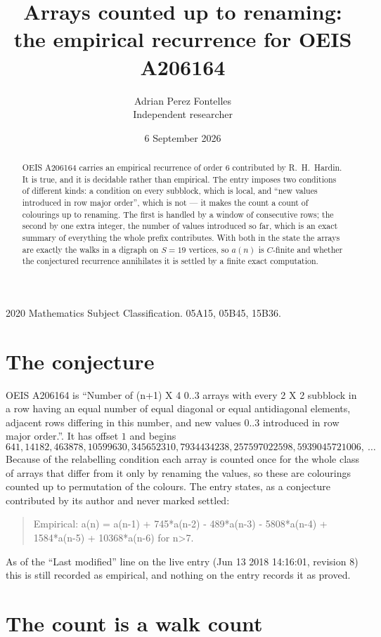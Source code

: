 \documentclass[11pt,a4paper]{article}
\title{Arrays counted up to renaming: the empirical recurrence for OEIS A206164}
\author{Adrian Perez Fontelles\\ \small Independent researcher}
\date{6 September 2026}
\theoremstyle{plain}
\theoremstyle{definition}
\begin{document}
\maketitle

\begin{abstract}
OEIS A206164 carries an empirical recurrence of order $6$ contributed by R.~H.~Hardin. It is
true, and it is decidable rather than empirical. The entry imposes two conditions of different
kinds: a condition on every subblock, which is local, and ``new values introduced in row major
order'', which is not --- it makes the count a count of colourings up to renaming. The first is
handled by a window of consecutive rows; the second by one extra integer, the number of values
introduced so far, which is an exact summary of everything the whole prefix contributes. With
both in the state the arrays are exactly the walks in a digraph on $S=19$ vertices, so $a(n)$
is $C$-finite and whether the conjectured recurrence annihilates it is settled by a finite
exact computation.
\end{abstract}

\noindent\small 2020 Mathematics Subject Classification. 05A15, 05B45, 15B36.\normalsize

\section{The conjecture}

OEIS A206164 is ``Number of (n+1) X 4 0..3 arrays with every 2 X 2 subblock in a row having an equal number of equal diagonal or equal antidiagonal elements, adjacent rows differing in this number, and new values 0..3 introduced in row major order.''. It has offset $1$ and begins
\[
641, 14182, 463878, 10599630, 345652310, 7934434238, 257597022598, 5939045721006,\ \dots
\]
Because of the relabelling condition each array is counted once for the whole class of arrays that differ from it only by renaming the values, so these are colourings counted up to permutation of the colours.
The entry states, as a conjecture contributed by its author and never marked settled:
\begin{quote}
Empirical: a(n) = a(n-1) + 745*a(n-2) - 489*a(n-3) - 5808*a(n-4) + 1584*a(n-5) + 10368*a(n-6) for n>7.
\end{quote}
As of the ``Last modified'' line on the live entry (Jun 13 2018 14:16:01, revision 8) this is still
recorded as empirical, and nothing on the entry records it as proved.

\section{The count is a walk count}
\end{document}
